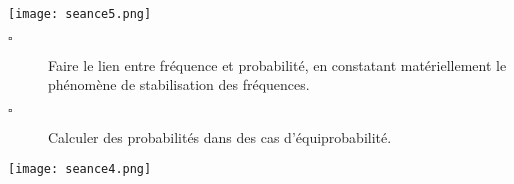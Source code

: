 \documentclass[openany]{book}
\begin{document}




\texttt{[image: seance5.png]} 


\begin{seance}[Probabilités]

\begin{description}
\item[$\square$] Faire le lien entre fréquence et probabilité, en constatant matériellement le phénomène de stabilisation des fréquences.
\end{description}
\end{seance}


\begin{seance}[Probabilités]

\begin{description}
\item[$\square$] Calculer des probabilités dans des cas d'équiprobabilité.
\end{description}
\end{seance}






\texttt{[image: seance4.png]} 
\end{document}
